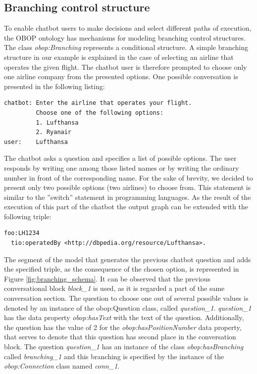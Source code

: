 \documentclass[runningheads]{llncs}
\begin{document}
\FloatBarrier
\subsection{Branching control structure}
To enable chatbot users to make decisions and select different paths of execution, the OBOP ontology has mechanisms for modeling branching control structures. The class \textit{obop:Branching} represents a conditional structure. A simple branching structure in our example is explained in the case of selecting an airline that operates the given flight. The chatbot user is therefore prompted to choose only one airline company from the presented options.  
One possible conversation is presented in the following listing:
\begin{lstlisting}[basicstyle=\small,  xleftmargin=0.7cm ]
chatbot: Enter the airline that operates your flight.
         Choose one of the following options:
         1. Lufthansa
         2. Ryanair
user:    Lufthansa 
\end{lstlisting}
The chatbot asks a question and specifies a list of possible options. The user responds by writing one among those listed names or by writing the ordinary number in front of the corresponding name. For the sake of brevity, we decided to present only two possible options (two airlines) to choose from. This statement is similar to the ''switch'' statement in programming languages. As the result of the execution of this part of the chatbot the output graph can be extended with the following triple:
\begin{lstlisting}[basicstyle=\small,  xleftmargin=0.7cm ]
foo:LH1234
  tio:operatedBy <http://dbpedia.org/resource/Lufthansa>.
\end{lstlisting}
The segment of the model that generates the previous chatbot question and adds the specified triple, as the consequence of the chosen option, is represented in Figure \ref{fig:branching_schema}. It can be observed that the previous conversational block \textit{block\_1} is used, as it is regarded a part of the same conversation section. The question to choose one out of several possible values is denoted by an instance of the obop:Question class, called \textit{question\_1}. \textit{question\_1} has the data property \textit{obop:hasText} with the text of the question. Additionally, the question has the value of 2 for the \textit{obop:hasPositionNumber} data property, that serves to denote that this question has second place in the conversation block.         
The question \textit{question\_1} has an instance of the class \textit{obop:hasBranching} called \textit{branching\_1} and this branching is specified by the instance of the \textit{obop:Connection} class named \textit{conn\_1}.
\end{document}
